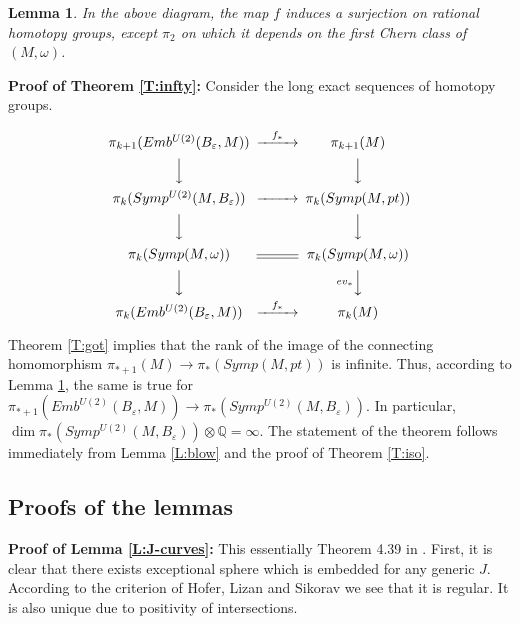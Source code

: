 \documentclass[a4paper,14pt]{article}
\newcommand{\B}[1]{\mathbb #1}
\newcommand{\eps}{{\varepsilon}}
\newcommand{\qed}{\rightline {$\Box $}}
\newcommand{\Mo}{(M,\omega )}
\newcommand{\BS}{{\bigskip}}
\newcommand{\NI}{{\noindent}}
\newtheorem{rem}[theorem]{Remark}
\newtheorem{lemma}[theorem]{Lemma}
\numberwithin{equation}{section}
\numberwithin{figure}{section}
\begin{document}
\begin{lemma}\label{L:fsur}
In the above diagram, the map $f$ induces a surjection on
rational homotopy groups, except $\pi_2$ on which it
depends on the first Chern class of $\Mo$.
\end{lemma}


\BS
\NI
{\bf Proof of Theorem \ref{T:infty}:}
Consider the long exact sequences of homotopy groups.



$$
\CD
\pi_{k+1}(Emb^{U(2)}(B_{\eps},M))  @>{f_*}>>\pi_{k+1}( M)\\
          @VVV                       @VVV       \\          
\pi_k(Symp^{U(2)}(M,B_{\eps})) @>>>\pi_k( Symp(M,pt)) \\
          @VVV                       @VVV       \\
\pi_k(Symp\Mo) @=                  \pi_k(Symp\Mo )   \\
@VVV                                @V{ev_*}VV       \\
\pi_k(Emb^{U(2)}(B_{\eps},M))  @>{f_*}>>\pi_k( M)          
\endCD
$$


\BS
\NI
Theorem \ref{T:got} implies that 
the rank of the image of the connecting homomorphism
$\pi_{*+1}(M)\to \pi_*(Symp(M,pt))$ is infinite. Thus,
according to Lemma \ref{L:fsur}, the same is true for
$\pi_{*+1}(Emb^{U(2)}(B_{\eps},M))\to \pi_*(Symp^{U(2)}(M,B_{\eps}))$.
In particular,
$\dim \pi_*(Symp^{U(2)}(M,B_{\eps}))\otimes \B Q = \infty$.
The statement of the theorem follows immediately from
Lemma \ref{L:blow} and the proof of Theorem \ref{T:iso}.


\qed




\subsection {Proofs of the lemmas}

\BS
\NI
{\bf Proof of Lemma \ref{L:J-curves}:} This essentially Theorem 4.39
in \cite{ms}. First, it is clear that there exists exceptional sphere
which is embedded for any generic $J$. According to the criterion
of Hofer, Lizan and Sikorav \cite{hls} we see that it is regular.
It is also unique due to positivity of intersections.
\end{document}
